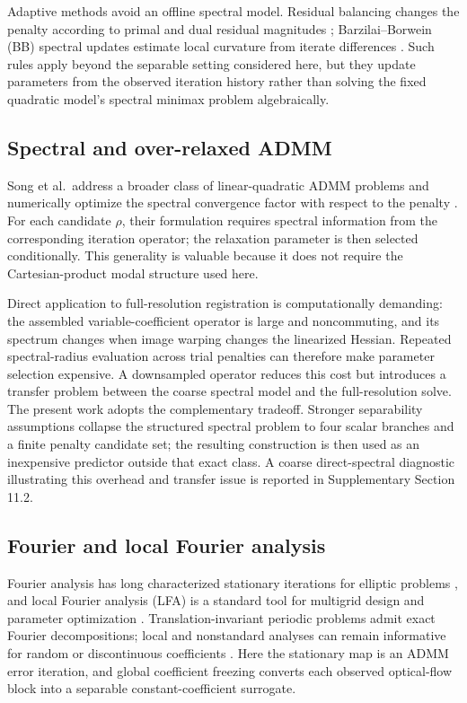 \documentclass[11pt]{article}
\theoremstyle{definition}
\begin{document}
Adaptive methods avoid an offline spectral model. Residual balancing changes
the penalty according to primal and dual residual magnitudes
\cite{Wohlberg2017}; Barzilai--Borwein (BB) spectral updates estimate local
curvature from iterate differences \cite{Xu2017}. Such rules apply beyond the
separable setting considered here, but they update parameters from the
observed iteration history rather than solving the fixed quadratic model's
spectral minimax problem algebraically.

\subsection{Spectral and over-relaxed ADMM}
Song et al.\ address a broader class of linear-quadratic ADMM problems and
numerically optimize the spectral convergence factor with respect to the
penalty \cite{Song2024}. For each candidate $\rho$, their formulation requires
spectral information from the corresponding iteration operator; the
relaxation parameter is then selected conditionally. This generality is
valuable because it does not require the Cartesian-product modal structure
used here.

Direct application to full-resolution registration is computationally
demanding: the assembled variable-coefficient operator is large and
noncommuting, and its spectrum changes when image warping changes the
linearized Hessian. Repeated spectral-radius evaluation across trial penalties
can therefore make parameter selection expensive. A downsampled operator
reduces this cost but introduces a transfer problem between the coarse
spectral model and the full-resolution solve. The present work adopts the
complementary tradeoff. Stronger separability assumptions collapse the
structured spectral problem to four scalar branches and a finite penalty
candidate set; the resulting construction is then used as an inexpensive
predictor outside that exact class.
A coarse direct-spectral diagnostic illustrating this overhead and transfer
issue is reported in Supplementary Section 11.2.

\subsection{Fourier and local Fourier analysis}
Fourier analysis has long characterized stationary iterations for elliptic
problems \cite{ChanElman1989}, and local Fourier analysis (LFA) is a standard
tool for multigrid design and parameter optimization
\cite{WienandsJoppich2005}. Translation-invariant periodic problems admit exact
Fourier decompositions; local and nonstandard analyses can remain informative
for random or discontinuous coefficients \cite{Rodrigo2019,Kumar2019}. Here the
stationary map is an ADMM error iteration, and global coefficient freezing
converts each observed optical-flow block into a separable constant-coefficient
surrogate.
\end{document}

